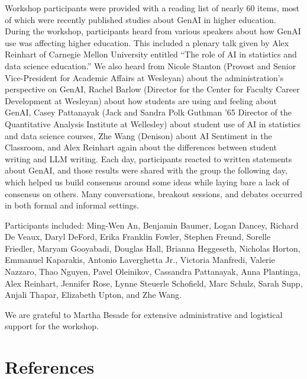 \documentclass[
]{hdsr}
\begin{document}
Workshop participants were provided with a reading list of nearly 60
items, most of which were recently published studies about GenAI in
higher education. During the workshop, participants heard from various
speakers about how GenAI use was affecting higher education. This
included a plenary talk given by Alex Reinhart of Carnegie Mellon
University entitled ``The role of AI in statistics and data science
education.'' We also heard from Nicole Stanton (Provost and Senior
Vice-President for Academic Affairs at Wesleyan) about the
administration's perspective on GenAI, Rachel Barlow (Director for the
Center for Faculty Career Development at Wesleyan) about how students
are using and feeling about GenAI, Casey Pattanayak (Jack and Sandra
Polk Guthman '65 Director of the Quantitative Analysis Institute at
Wellesley) about student use of AI in statistics and data science
courses, Zhe Wang (Denison) about AI Sentiment in the Classroom, and
Alex Reinhart again about the differences between student writing and
LLM writing. Each day, participants reacted to written statements about
GenAI, and those results were shared with the group the following day,
which helped us build consensus around some ideas while laying bare a
lack of consensus on others. Many conversations, breakout sessions, and
debates occurred in both formal and informal settings.

Participants included: Ming-Wen An, Benjamin Baumer, Logan Dancey,
Richard De Veaux, Daryl DeFord, Erika Franklin Fowler, Stephen Freund,
Sorelle Friedler, Maryam Gooyabadi, Douglas Hall, Brianna Heggeseth,
Nicholas Horton, Emmanuel Kaparakis, Antonio Laverghetta Jr., Victoria
Manfredi, Valerie Nazzaro, Thao Nguyen, Pavel Oleinikov, Cassandra
Pattanayak, Anna Plantinga, Alex Reinhart, Jennifer Rose, Lynne Steuerle
Schofield, Marc Schulz, Sarah Supp, Anjali Thapar, Elizabeth Upton, and
Zhe Wang.

We are grateful to Martha Besade for extensive administrative and
logistical support for the workshop.

\section*{References}\label{references}
\end{document}
